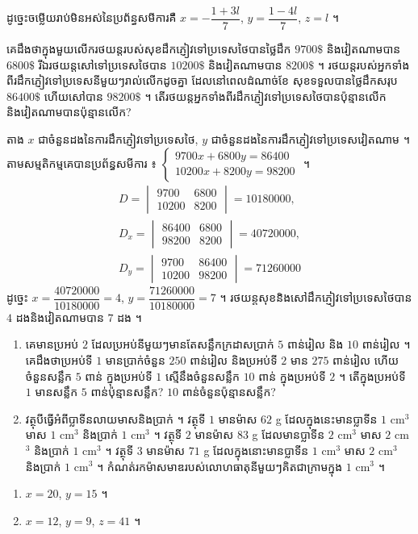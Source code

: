 \begin{enumerate}[a]
  ដូច្នេះចម្លើយរាប់មិនអស់នៃប្រព័ន្ធសមីការគឺ $x = -\dfrac{1 + 3l}{7}$, $y = \dfrac{1 - 4l}{7}$, $z = l$ ។
\end{enumerate}

\begin{example}[លំហាត់គំរូ ៣]
គេដឹងថាក្នុងមួយលើករថយន្តរបស់សុខដឹកភ្ញៀវទៅប្រទេសថៃបានថ្លៃដឹក $9700\$$ និងវៀតណាមបាន $6800\$$ រីឯរថយន្តសៅទៅប្រទេសថៃបាន $10200\$$ និងវៀតណាមបាន $8200\$$ ។ រថយន្តរបស់អ្នកទាំងពីរដឹកភ្ញៀវទៅប្រទេសនីមួយៗរាល់លើកដូចគ្នា ដែលនៅពេលដំណាច់ខែ សុខទទួលបានថ្លៃដឹកសរុប $86400\$$ ហើយសៅបាន $98200\$$ ។ តើរថយន្តអ្នកទាំងពីរដឹកភ្ញៀវទៅប្រទេសថៃបានប៉ុន្មានលើកនិងវៀតណាមបានប៉ុន្មានលើក?
\end{example}
\ans
តាង $x$ ជាចំនួនដងនៃការដឹកភ្ញៀវទៅប្រទេសថៃ, $y$ ជាចំនួនដងនៃការដឹកភ្ញៀវទៅប្រទេសវៀតណាម ។ តាមសម្មតិកម្មគេបានប្រព័ន្ធសមីការ ៖ $\begin{cases} 9700x + 6800y = 86400\\ 10200x + 8200y = 98200 \end{cases}$ ។
\[
\begin{gathered}
D = \begin{vmatrix} 9700 & 6800\\ 10200 & 8200 \end{vmatrix} = 10180000,\\
D_x = \begin{vmatrix} 86400 & 6800\\ 98200 & 8200 \end{vmatrix} = 40720000,\\
D_y = \begin{vmatrix} 9700 & 86400\\ 10200 & 98200 \end{vmatrix} = 71260000
\end{gathered}
\]
ដូច្នេះ $x = \dfrac{40720000}{10180000} = 4$, $y = \dfrac{71260000}{10180000} = 7$ ។ រថយន្តសុខនិងសៅដឹកភ្ញៀវទៅប្រទេសថៃបាន $4$ ដងនិងវៀតណាមបាន $7$ ដង ។

\begin{pro}
\begin{enumerate}[1]
  \item គេមានប្រអប់ $2$ ដែលប្រអប់នីមួយៗមានតែសន្លឹកក្រដាសប្រាក់ $5$ ពាន់រៀល និង $10$ ពាន់រៀល ។ គេដឹងថាប្រអប់ទី $1$ មានប្រាក់ចំនួន $250$ ពាន់រៀល និងប្រអប់ទី $2$ មាន $275$ ពាន់រៀល ហើយចំនួនសន្លឹក $5$ ពាន់ ក្នុងប្រអប់ទី $1$ ស្មើនឹងចំនួនសន្លឹក $10$ ពាន់ ក្នុងប្រអប់ទី $2$ ។ តើក្នុងប្រអប់ទី $1$ មានសន្លឹក $5$ ពាន់ប៉ុន្មានសន្លឹក? $10$ ពាន់ចំនួនប៉ុន្មានសន្លឹក?
  \item វត្ថុបីធ្វើអំពីប្លាទីនលាយមាសនិងប្រាក់ ។ វត្ថុទី $1$ មានម៉ាស $62$ g ដែលក្នុងនេះមានប្លាទីន $1$ cm$^3$ មាស $1$ cm$^3$ និងប្រាក់ $1$ cm$^3$ ។ វត្ថុទី $2$ មានម៉ាស $83$ g ដែលមានប្លាទីន $2$ cm$^3$ មាស $2$ cm$^3$ និងប្រាក់ $1$ cm$^3$ ។ វត្ថុទី $3$ មានម៉ាស $71$ g ដែលក្នុងនោះមានប្លាទីន $1$ cm$^3$ មាស $2$ cm$^3$ និងប្រាក់ $1$ cm$^3$ ។ កំណត់រកម៉ាសមាឌរបស់លោហធាតុនីមួយៗគិតជាក្រាមក្នុង $1$ cm$^3$ ។
\end{enumerate}
\ans
\begin{enumerate}[1]
  \item $x = 20$, $y = 15$ ។
  \item $x = 12$, $y = 9$, $z = 41$ ។
\end{enumerate}
\end{pro}

